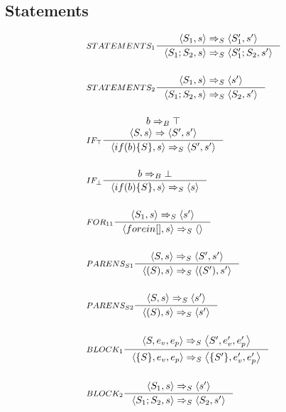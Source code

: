 \subsection{Statements}
\begin{align*}
&\inference[$STATEMENTS_1$]{\Braket{S_1,s} \Rightarrow_S \Braket{S_1',s'}}
                         {\Braket{S_1 ; S_2, s} \Rightarrow_S \Braket{S_1' ; S_2, s'}}
\\\\
&\inference[$STATEMENTS_2$]{\Braket{S_1,s} \Rightarrow_S \Braket{s'}}
                         {\Braket{S_1 ; S_2, s} \Rightarrow_S \Braket{S_2, s'}}
\\\\
&\inference[$IF_\top$]{b \Rightarrow_B \top \\ \Braket{S, s} \Rightarrow \Braket{S', s'}}
                      {\Braket{if(b)\{S\}, s} \Rightarrow_S \Braket{S', s'}}
\\\\
&\inference[$IF_\bot$]{b \Rightarrow_B \bot}
                      {\Braket{if(b)\{S\}, s} \Rightarrow_S \Braket{s}}
\\\\
&\inference[$FOR_{11}$]{\Braket{S_1,s} \Rightarrow_S \Braket{s'}}
                       {\Braket{for e in [], s} \Rightarrow_S \Braket{}}
\\\\
&\inference[$PARENS_{S1}$]{\Braket{S,s} \Rightarrow_S \Braket{S',s'}}
                       {\Braket{(S), s} \Rightarrow_S \Braket{(S'), s'}}
\\\\
&\inference[$PARENS_{S2}$]{\Braket{S,s} \Rightarrow_S \Braket{s'}}
                       {\Braket{(S), s} \Rightarrow_S \Braket{s'}}
\\\\
&\inference[$BLOCK_1$]{\Braket{S,e_v,e_p} \Rightarrow_S \Braket{S',e_v',e_p'}}
                         {\Braket{\{S\}, e_v, e_p} \Rightarrow_S \Braket{\{S'\}, e_v',e_p'}}
\\\\
&\inference[$BLOCK_2$]{\Braket{S_1,s} \Rightarrow_S \Braket{s'}}
                         {\Braket{S_1 ; S_2, s} \Rightarrow_S \Braket{S_2, s'}}
\end{align*}